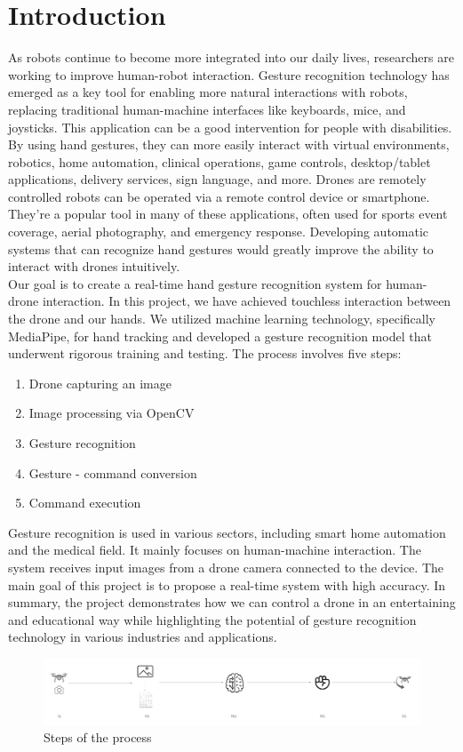 \clearpage
\chapter{Introduction}
\label{ch:intro}

As robots continue to become more integrated into our daily lives, researchers are working to improve human-robot interaction. Gesture recognition technology has emerged as a key tool for enabling more natural interactions with robots, replacing traditional human-machine interfaces like keyboards, mice, and joysticks. This application can be a good intervention for people with disabilities. By using hand gestures, they can more easily interact with virtual environments, robotics, home automation, clinical operations, game controls, desktop/tablet applications, delivery services, sign language, and more. 
Drones are remotely controlled robots can be operated via a remote control device or smartphone. They're a popular tool in many of these applications, often used for sports event coverage, aerial photography, and emergency response. Developing automatic systems that can recognize hand gestures would greatly improve the ability to interact with drones intuitively.
\\ Our goal is to create a real-time hand gesture recognition system for human-drone interaction. In this project, we have achieved touchless interaction between the drone and our hands. We utilized machine learning technology, specifically MediaPipe, for hand tracking and developed a gesture recognition model that underwent rigorous training and testing. The process involves five steps: 
\begin{enumerate}[label=\Roman*.]
	\item Drone capturing an image
	\item Image processing via OpenCV
	\item Gesture recognition
	\item Gesture - command conversion
	\item Command execution
	
\end{enumerate}
Gesture recognition is used in various sectors, including smart home automation and the medical field. It mainly focuses on human-machine interaction. The system receives input images from a drone camera connected to the device. The main goal of this project is to propose a real-time system with high accuracy. In summary, the project demonstrates how we can control a drone in an entertaining and educational way while highlighting the potential of gesture recognition technology in various industries and applications.
\begin{figure}
	\centering
	\includegraphics[width = \textwidth]{images/steps.pdf}
	\caption{Steps of the process}
	\label{fig:conclusion}
\end{figure}
